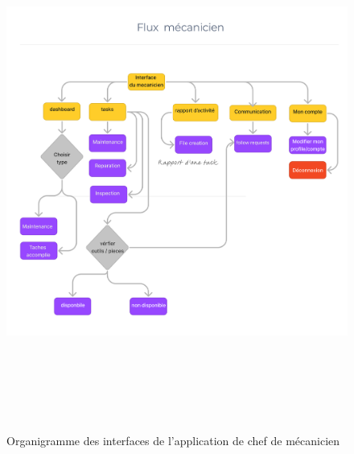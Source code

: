 \begin{figure}[htbp]
  \centering
  \includegraphics[width=1.05\textwidth,height=17cm]{chap2.images/org mecanicien.png}
  \caption{Organigramme des interfaces de l'application de chef de mécanicien}
\end{figure}

